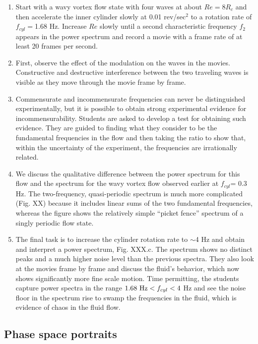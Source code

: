 \documentclass[%
reprint,
 amsmath,amssymb,
 aps,
prb,
floatfix,
longbibliography,
notitlepage
]{revtex4-1}
\begin{document}
\begin{enumerate}
\begin{enumerate}
\item  Start with a wavy vortex flow state with four waves at about $Re=8R_c$ and then accelerate the inner cylinder slowly at 0.01 rev/sec$^2$ to a rotation rate of $f_{cyl}=$1.68 Hz. Increase $Re$ slowly  until a second characteristic frequency $f_2$ appears in the power spectrum and record a movie with a frame rate of at least 20 frames per second.
\item  First, observe the effect of the modulation on the waves in the movies. Constructive and destructive interference between the two traveling waves is visible as they move through the movie frame by frame.
\item  Commensurate and incommensurate frequencies can never be distinguished experimentally, but it is possible to obtain strong experimental evidence for incommensurability.  Students are asked to develop a test for obtaining such evidence. They are guided to finding what they consider to be the fundamental frequencies in the flow and then taking the ratio to show that, within the uncertainty of the experiment, the frequencies are irrationally related.
\item We discuss the qualitative difference between the power spectrum for this flow and the spectrum for the wavy vortex flow observed earlier at $f_{cyl}$= 0.3 Hz. The two-frequency, quasi-periodic spectrum is much more complicated (Fig. XX) because it includes linear sums of the two fundamental frequencies, whereas the figure shows the relatively simple ``picket fence'' spectrum of a singly periodic flow state.
\item The final task is to increase the cylinder rotation rate to $\sim$4 Hz and obtain and interpret a power spectrum, Fig. XXX.c.  The spectrum shows no distinct peaks and a much higher noise level than the previous spectra. They also look at the movies frame by frame and discuss the fluid's behavior, which now shows significantly more fine scale motion. Time permitting, the students  capture power spectra in the range $1.68 {\rm ~Hz} <f_{cyl}<4$ Hz and see the noise floor in the spectrum rise to swamp the frequencies in the fluid, which is evidence of chaos in the fluid flow.
\end{enumerate}

\end{enumerate}


\subsection{Phase space portraits}
\end{document}
